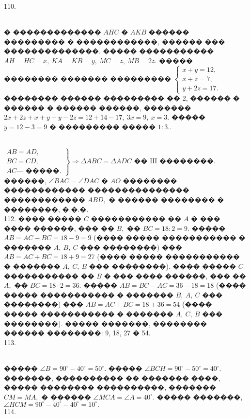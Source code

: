 \documentclass[12pt]{article}
\begin{document}
110. \begin{figure}[ht!]
\end{figure}\\
� ������������� $AHC$ � $AKB$ ������ ��������� � ������������, ������ ��� ��������������. ����� ����������� $AH=HC=x,\ KA=KB=y,\ MC=z,\ MB=2z.$ ����� �������� ������� ��������� $\begin{cases} x+y=12,\\ x+z=7,\\ y+2z=17.\end{cases}$ �������� ������ ��������� �� 2, ������ � ������ � ������ ������, ������� $2x+2z+x+y-y-2z=12+14-17,\ 3x=9,\ x=3.$ ����� $y=12-3=9$ � ��������� ����� $1:3.$\newpage{}. \begin{figure}[ht!]
\end{figure}\\
$\left.\begin{array}{l}AB=AD,\\
BC=CD,\\
AC\text{--- �����.}  \end{array}\right\}\Rightarrow \Delta ABC=\Delta ADC\text{ �� III ��������.}$ ������, $\angle BAC=\angle DAC$ � $AO$ �������� ������������ ��������������� ������������ $ABD,$ � ������ �������� � ��������, �.�.�.\\
112. ���� ����� $C$ ����������� �� $A$ � ��� ���� ������, ��� �� $B,$ �� $BC=18:2=9.$ ����� $AB=AC-BC=18-9=9$ (���� ����� ����������� � ������� $A,\ B,\ C$ ��� ��������) ��� $AB=AC+BC=18+9=27$ (���� ����� ����������� � ������� $A,\ C,\ B$ ��� ��������). ���� ����� $C$ ����������� �� $B$ � ��� ���� ������, ��� �� $A,$ �� $BC=18\cdot2=36.$ ����� $AB=BC-AC=36-18=18$ (���� ����� ����������� � ������� $B,\ A,\ C$ ��� ��������) ��� $AB=AC+BC=18+36=54$ (���� ����� ����������� � ������� $A,\ C,\ B$ ��� ��������). ����� �������, �������� ������ ��������: 9, 18, 27 � 54.\\
113. \begin{figure}[ht!]
\end{figure}\\
����� $\angle B=90^\circ-40^\circ=50^\circ.$ ����� $\angle BCH=90^\circ-50^\circ=40^\circ.$ �������, ���������� �� ������� ����, ����� �������� ����������, ������� $CM=MA,$ � ������ $\angle MCA=\angle A=40^\circ.$ ����� �������, $\angle HCM=90^\circ-40^\circ-40^\circ=10^\circ.$\\
114. \begin{figure}[ht!]
\end{figure}\\
\end{document}
